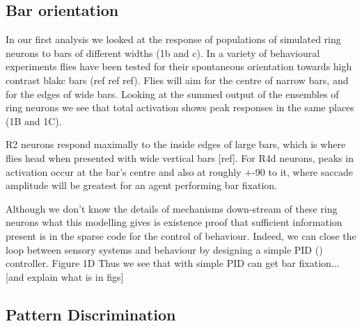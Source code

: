 \begin{comment}
\texthl{
Things to maybe include: \\
-- discussion of pid that will be in Fig. 1 (but isn't yet) \\
-- are RFs orientation detectors or more binary `is it vertical or not' detectors? \\
-- is this vertical tuning related to ecology? \\
-- is it something like the oblique effect?

Papers: \\
-- Neuser et al.'s paper on STM for bar position in R4s \\
-- other paper about learning a heading relative to a pattern in R4s \\
-- the new S\&J paper 
}
\end{comment}

\subsection{Bar orientation}
In our first analysis we looked at the response of populations of simulated ring neurons to bars of different widths (1b and c). In a variety of behavioural experiments flies have been tested for their spontaneous orientation towards high contrast blakc bars (ref ref ref). Flies will aim for the centre of narrow bars, and for the edges of wide bars. Looking at the summed output of the ensembles of ring neurons we see that total activation shows peak responses in the same places (1B and 1C). 

R2 neurons respond maximally to the inside edges of large bars, which is where flies head when presented with wide vertical bars [ref]. For R4d neurons, peaks in activation occur at the bar's centre and also at roughly +-90 to it, where saccade amplitude will be greatest for an agent performing bar fixation.

Although we don't know the details of mechanisms down-stream of these ring neurons what this modelling gives is existence proof that sufficient information present is in the sparse code for the control of behaviour. Indeed, we can close the loop between sensory systems and behaviour by designing a simple PID () controller. Figure 1D 
Thus we see that with simple PID can get bar fixation... [and explain what is in figs]


\subsection{Pattern Discrimination}
\label{sec:results:pattern}

